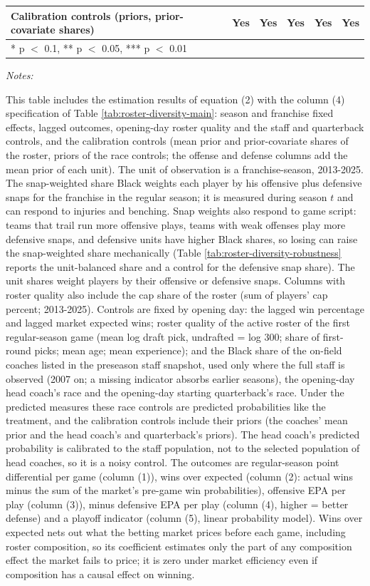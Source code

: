 \begin{table}[!h]
{\begin{threeparttable}
\begin{tabular}[t]{lccccc}
Calibration controls (priors, prior-covariate shares) & Yes & Yes & Yes & Yes & Yes\\
\bottomrule
\multicolumn{6}{l}{\rule{0pt}{1em}* p $<$ 0.1, ** p $<$ 0.05, *** p $<$ 0.01}\\
\end{tabular}
\begin{tablenotes}[para]
\item \textit{Notes:} 
\item This table includes the estimation results of equation (2) with the column (4) specification of Table \ref{tab:roster-diversity-main}: season and franchise fixed effects, lagged outcomes, opening-day roster quality and the staff and quarterback controls, and the calibration controls (mean prior and prior-covariate shares of the roster, priors of the race controls; the offense and defense columns add the mean prior of each unit). The unit of observation is a franchise-season, 2013-2025. The snap-weighted share Black weights each player by his offensive plus defensive snaps for the franchise in the regular season; it is measured during season $t$ and can respond to injuries and benching. Snap weights also respond to game script: teams that trail run more offensive plays, teams with weak offenses play more defensive snaps, and defensive units have higher Black shares, so losing can raise the snap-weighted share mechanically (Table \ref{tab:roster-diversity-robustness} reports the unit-balanced share and a control for the defensive snap share). The unit shares weight players by their offensive or defensive snaps. Columns with roster quality also include the cap share of the roster (sum of players' cap percent; 2013-2025). Controls are fixed by opening day: the lagged win percentage and lagged market expected wins; roster quality of the active roster of the first regular-season game (mean log draft pick, undrafted = log 300; share of first-round picks; mean age; mean experience); and the Black share of the on-field coaches listed in the preseason staff snapshot, used only where the full staff is observed (2007 on; a missing indicator absorbs earlier seasons), the opening-day head coach's race and the opening-day starting quarterback's race. Under the predicted measures these race controls are predicted probabilities like the treatment, and the calibration controls include their priors (the coaches' mean prior and the head coach's and quarterback's priors). The head coach's predicted probability is calibrated to the staff population, not to the selected population of head coaches, so it is a noisy control. The outcomes are regular-season point differential per game (column (1)), wins over expected (column (2): actual wins minus the sum of the market's pre-game win probabilities), offensive EPA per play (column (3)), minus defensive EPA per play (column (4), higher = better defense) and a playoff indicator (column (5), linear probability model). Wins over expected nets out what the betting market prices before each game, including roster composition, so its coefficient estimates only the part of any composition effect the market fails to price; it is zero under market efficiency even if composition has a causal effect on winning. 
\end{tablenotes}
\end{threeparttable}}
\end{table}
